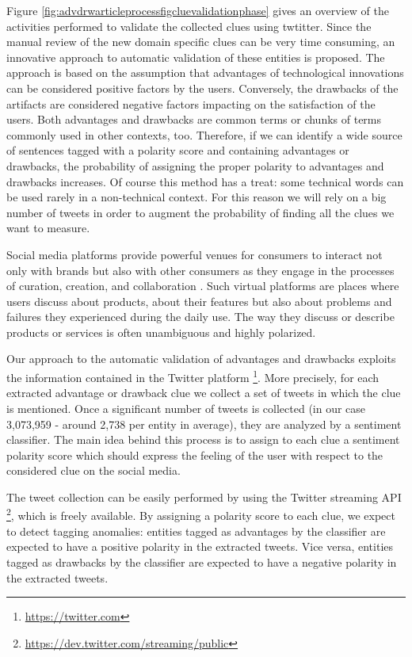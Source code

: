 \documentclass[b5paper,]{book}
\let\rmarkdownfootnote\footnote%
\def\footnote{\protect\rmarkdownfootnote}
\theoremstyle{definition}
\theoremstyle{definition}
\theoremstyle{definition}
\theoremstyle{remark}
\begin{document}
Figure \ref{fig:advdrwarticleprocessfigcluevalidationphase} gives an
overview of the activities performed to validate the collected clues
using twtitter. Since the manual review of the new domain specific clues
can be very time consuming, an innovative approach to automatic
validation of these entities is proposed. The approach is based on the
assumption that advantages of technological innovations can be
considered positive factors by the users. Conversely, the drawbacks of
the artifacts are considered negative factors impacting on the
satisfaction of the users. Both advantages and drawbacks are common
terms or chunks of terms commonly used in other contexts, too.
Therefore, if we can identify a wide source of sentences tagged with a
polarity score and containing advantages or drawbacks, the probability
of assigning the proper polarity to advantages and drawbacks increases.
Of course this method has a treat: some technical words can be used
rarely in a non-technical context. For this reason we will rely on a big
number of tweets in order to augment the probability of finding all the
clues we want to measure.

Social media platforms provide powerful venues for consumers to interact
not only with brands but also with other consumers as they engage in the
processes of curation, creation, and collaboration
\citep{evans2010social}. Such virtual platforms are places where users
discuss about products, about their features but also about problems and
failures they experienced during the daily use. The way they discuss or
describe products or services is often unambiguous and highly polarized.

Our approach to the automatic validation of advantages and drawbacks
exploits the information contained in the Twitter platform \footnote{\url{https://twitter.com}}.
More precisely, for each extracted advantage or drawback clue we collect
a set of tweets in which the clue is mentioned. Once a significant
number of tweets is collected (in our case 3,073,959 - around 2,738 per
entity in average), they are analyzed by a sentiment classifier. The
main idea behind this process is to assign to each clue a sentiment
polarity score which should express the feeling of the user with respect
to the considered clue on the social media.

The tweet collection can be easily performed by using the Twitter
streaming API \footnote{\url{https://dev.twitter.com/streaming/public}},
which is freely available. By assigning a polarity score to each clue,
we expect to detect tagging anomalies: entities tagged as advantages by
the classifier are expected to have a positive polarity in the extracted
tweets. Vice versa, entities tagged as drawbacks by the classifier are
expected to have a negative polarity in the extracted tweets.
\end{document}
